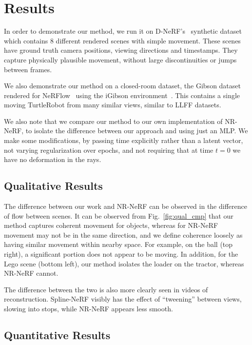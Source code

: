 \section*{Results}

In order to demonstrate our method, we run it on D-NeRF's~\cite{pumarola2020dnerf} synthetic dataset which contains 8 different rendered scenes with simple movement. These scenes have ground truth camera positions, viewing directions and timestamps. They capture physically plausible movement, without large discontinuities or jumps between frames.

We also demonstrate our method on a closed-room dataset, the Gibson dataset rendered for NeRFlow~\cite{du2021nerflow} using the iGibson environment~\cite{xu2019DISN}. This contains a single moving TurtleRobot from many similar views, similar to LLFF datasets.

We also note that we compare our method to our own implementation of NR-NeRF, to isolate the difference between our approach and using just an MLP. We make some modifications, by passing time explicitly rather than a latent vector, not varying regularization over epochs, and not requiring that at time $t=0$ we have no deformation in the rays.

\subsection*{Qualitative Results}

The difference between our work and NR-NeRF can be observed in the difference of flow between scenes. It can be observed from Fig.~\ref{fig:qual_cmp} that our method captures coherent movement for objects, whereas for NR-NeRF movement may not be in the same direction, and we define coherence loosely as having similar movement within nearby space. For example, on the ball (top right), a significant portion does not appear to be moving. In addition, for the Lego scene (bottom left), our method isolates the loader on the tractor, whereas NR-NeRF cannot.

The difference between the two is also more clearly seen in videos of reconstruction. Spline-NeRF visibly has the effect of ``tweening'' between views, slowing into stops, while NR-NeRF appears less smooth.

\subsection*{Quantitative Results}

